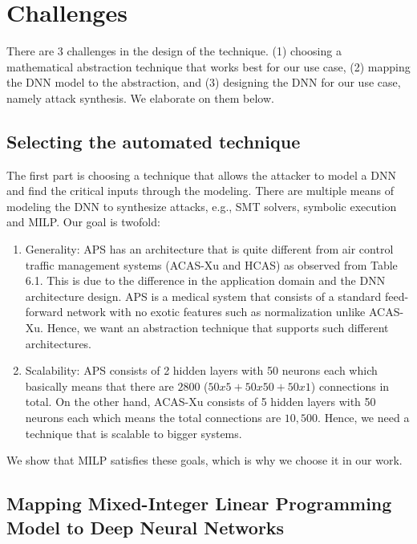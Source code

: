 \chapter{Challenges}
There are 3 challenges in the design of the technique. 
(1) choosing a mathematical abstraction technique that works best for our use case, 
(2) mapping the \ac{DNN}  model to the abstraction, and 
(3) designing the \ac{DNN}  for our use case, namely attack synthesis. 
We elaborate on them below. 


\section{Selecting  the automated technique}
The first part is choosing a technique that allows the attacker to model a DNN and find the critical inputs through the modeling. 
There are multiple means of modeling the DNN to synthesize attacks, e.g., SMT solvers, symbolic execution and MILP.
Our goal is twofold: 
\begin{enumerate}
	\item Generality: \ac{APS} has an architecture that %
	is quite different from air control traffic management systems (\ac{ACAS-Xu} and \ac{HCAS}) as observed from Table 6.1.
	This is due to the difference in the application domain and the \ac{DNN} architecture design. 
	\ac{APS} is a medical system that consists of a standard feed-forward network with no exotic features such as normalization 
	unlike \ac{ACAS-Xu}. 
	Hence, we want an abstraction technique that supports such different architectures. 
	\item Scalability: \ac{APS} consists of 2 hidden layers with 50 neurons each which basically means that there are $2800$ ($50x5 + 50x50 + 50x1$) connections in total.
	On the other hand, \ac{ACAS-Xu} consists of 5 hidden layers with 50 neurons each which means the total connections are $10,500$. 
	Hence, we need a technique that is scalable to bigger systems. 
	
\end{enumerate}

 We show that \ac{MILP} satisfies these goals, which is why we choose it in our work. %


\section{ Mapping  Mixed-Integer Linear Programming Model to Deep Neural Networks}


